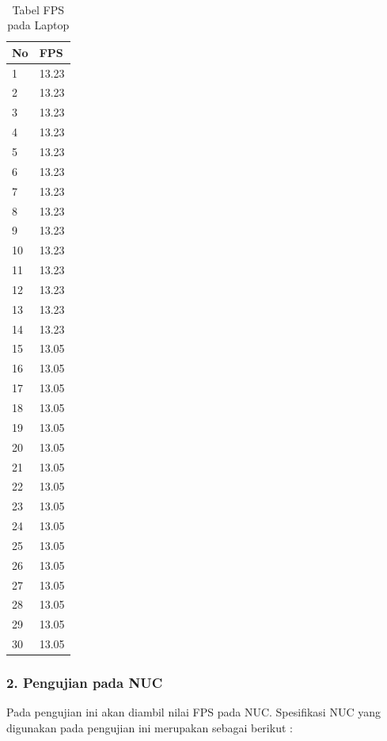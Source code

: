 \begin{table}[H]
    \centering
    \caption{Tabel FPS pada Laptop}
    \label{tb:FPS pada Laptop}                          \\
    \begin{tabular}{|l|l|}
    \hline
        No & FPS \\ \hline
        1 & 13.23 \\ \hline
        2 & 13.23 \\ \hline
        3 & 13.23 \\ \hline
        4 & 13.23 \\ \hline
        5 & 13.23 \\ \hline
        6 & 13.23 \\ \hline
        7 & 13.23 \\ \hline
        8 & 13.23 \\ \hline
        9 & 13.23 \\ \hline
        10 & 13.23 \\ \hline
        11 & 13.23 \\ \hline
        12 & 13.23 \\ \hline
        13 & 13.23 \\ \hline
        14 & 13.23 \\ \hline
        15 & 13.05 \\ \hline
        16 & 13.05 \\ \hline
        17 & 13.05 \\ \hline
        18 & 13.05 \\ \hline
        19 & 13.05 \\ \hline
        20 & 13.05 \\ \hline
        21 & 13.05 \\ \hline
        22 & 13.05 \\ \hline
        23 & 13.05 \\ \hline
        24 & 13.05 \\ \hline
        25 & 13.05 \\ \hline
        26 & 13.05 \\ \hline
        27 & 13.05 \\ \hline
        28 & 13.05 \\ \hline
        29 & 13.05 \\ \hline
        30 & 13.05 \\ \hline
    \end{tabular}
\end{table} 

\subsubsection*{2. Pengujian pada NUC}
Pada pengujian ini akan diambil nilai FPS pada NUC. Spesifikasi NUC yang digunakan pada pengujian ini merupakan sebagai berikut :

